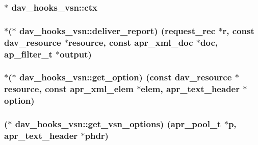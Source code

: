 \subsubsection[{\texorpdfstring{ctx}{ctx}}]{$\ast$ dav\+\_\+hooks\+\_\+vsn\+::ctx}\hypertarget{structdav__hooks__vsn_af5e40da45e314252ea3379f59d8d02a1}{}\label{structdav__hooks__vsn_af5e40da45e314252ea3379f59d8d02a1}
\subsubsection[{\texorpdfstring{deliver\+\_\+report}{deliver_report}}]{$\ast$($\ast$ dav\+\_\+hooks\+\_\+vsn\+::deliver\+\_\+report) ({\bf request\+\_\+rec} $\ast${\bf r}, const {\bf dav\+\_\+resource} $\ast${\bf resource}, const {\bf apr\+\_\+xml\+\_\+doc} $\ast${\bf doc}, {\bf ap\+\_\+filter\+\_\+t} $\ast${\bf output})}\hypertarget{structdav__hooks__vsn_aa52c36f442f1d10e9130f168ef1bdabb}{}\label{structdav__hooks__vsn_aa52c36f442f1d10e9130f168ef1bdabb}
\subsubsection[{\texorpdfstring{get\+\_\+option}{get_option}}]{$\ast$($\ast$ dav\+\_\+hooks\+\_\+vsn\+::get\+\_\+option) (const {\bf dav\+\_\+resource} $\ast${\bf resource}, const {\bf apr\+\_\+xml\+\_\+elem} $\ast${\bf elem}, {\bf apr\+\_\+text\+\_\+header} $\ast${\bf option})}\hypertarget{structdav__hooks__vsn_a80ef5fc6d0acb42ae2c216d70df70baf}{}\label{structdav__hooks__vsn_a80ef5fc6d0acb42ae2c216d70df70baf}
\subsubsection[{\texorpdfstring{get\+\_\+vsn\+\_\+options}{get_vsn_options}}]{($\ast$ dav\+\_\+hooks\+\_\+vsn\+::get\+\_\+vsn\+\_\+options) ({\bf apr\+\_\+pool\+\_\+t} $\ast${\bf p}, {\bf apr\+\_\+text\+\_\+header} $\ast${\bf phdr})}\hypertarget{structdav__hooks__vsn_aeb9e10749c39e06b6c400b4e0b3704ed}{}\label{structdav__hooks__vsn_aeb9e10749c39e06b6c400b4e0b3704ed}
